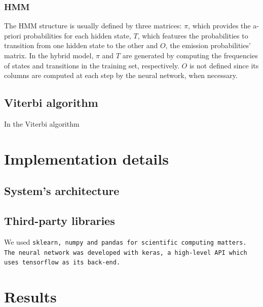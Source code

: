 \documentclass[10pt,a4paper]{article}
\begin{document}
	\subsubsection{HMM}
	The HMM structure is usually defined by three matrices: $\pi$, which provides the a-priori probabilities for each hidden state, $T$, which features the probabilities to transition from one hidden state to the other and  $O$, the emission probabilities' matrix. In the hybrid model, $\pi$ and $T$ are generated by computing the frequencies of states and transitions in the training set, respectively. $O$ is not defined since its columns are computed at each step by the neural network, when necessary. 
	\subsection{Viterbi algorithm}
	In the Viterbi algorithm
	\section{Implementation details}
	\subsection{System's architecture}
	\subsection{Third-party libraries}
	We used \tt sklearn\rm, \tt numpy \rm and \tt pandas \rm for scientific computing matters. The neural network was developed with \tt keras\rm, a high-level API which uses \tt tensorflow \rm as its back-end. 
	\section{Results}
\end{document}
